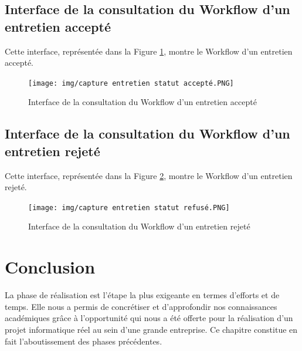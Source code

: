 \subsection{Interface de la consultation du Workflow d'un entretien accepté}
Cette interface, représentée dans la Figure  \ref{fig:capture_entretien_accepte}, montre le Workflow d'un entretien accepté.
\begin{figure}[H]
     \centering
     \texttt{[image: img/capture entretien statut accepté.PNG]}
     \caption{Interface de la consultation du Workflow d'un entretien accepté}
     \label{fig:capture_entretien_accepte}
 \end{figure}
\subsection{Interface de la consultation du Workflow d'un entretien rejeté}
Cette interface, représentée dans la Figure  \ref{fig:capture_entretien_rejeté}, montre le Workflow d'un entretien rejeté.
\begin{figure}[H]
     \centering
     \texttt{[image: img/capture entretien statut refusé.PNG]}
     \caption{Interface de la consultation du Workflow d'un entretien rejeté}
     \label{fig:capture_entretien_rejeté}
 \end{figure}
\section*{Conclusion}
La phase de réalisation est l’étape la plus exigeante en termes d'efforts et de temps. Elle nous a permis de concrétiser et d’approfondir nos connaissances académiques grâce à l’opportunité qui nous a été offerte pour la réalisation d’un projet informatique réel au sein
d’une grande entreprise. Ce chapitre constitue en fait l’aboutissement des phases précédentes. 
